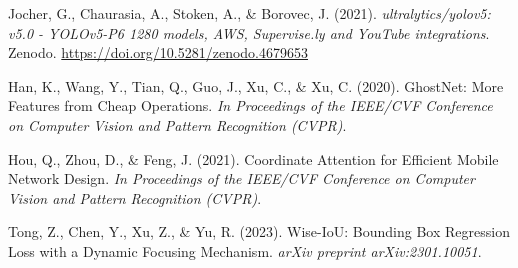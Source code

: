 \documentclass[a4paper]{ctexart}
\begin{document}
\begin{thebibliography}{9}
    Jocher, G., Chaurasia, A., Stoken, A., \& Borovec, J. (2021). \textit{ultralytics/yolov5: v5.0 - YOLOv5-P6 1280 models, AWS, Supervise.ly and YouTube integrations}. Zenodo. \url{https://doi.org/10.5281/zenodo.4679653}

    Han, K., Wang, Y., Tian, Q., Guo, J., Xu, C., \& Xu, C. (2020). GhostNet: More Features from Cheap Operations. \textit{In Proceedings of the IEEE/CVF Conference on Computer Vision and Pattern Recognition (CVPR)}.

    Hou, Q., Zhou, D., \& Feng, J. (2021). Coordinate Attention for Efficient Mobile Network Design. \textit{In Proceedings of the IEEE/CVF Conference on Computer Vision and Pattern Recognition (CVPR)}.

    Tong, Z., Chen, Y., Xu, Z., \& Yu, R. (2023). Wise-IoU: Bounding Box Regression Loss with a Dynamic Focusing Mechanism. \textit{arXiv preprint arXiv:2301.10051}.

\end{thebibliography}
\end{document}
